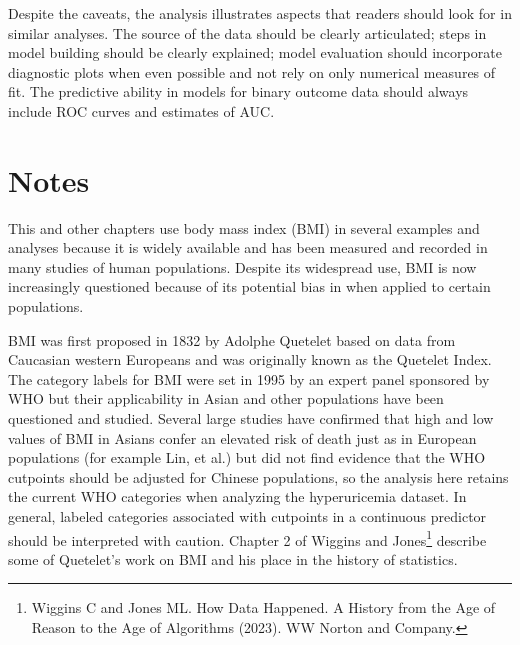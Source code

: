 Despite the caveats, the analysis illustrates aspects that readers should look for in similar analyses. The source of the data should be clearly articulated; steps in model building should be clearly explained; model evaluation should incorporate diagnostic plots when even possible and not rely on only numerical  measures of fit.  The predictive ability in models for binary outcome data should always include ROC curves and estimates of AUC.

\textD{\newpage}

\section{Notes}
\label{notesLogisticRegression}

This and other chapters use body mass index (BMI) in several examples and analyses because it is widely available and has been measured and recorded in many studies of human populations. Despite its widespread use, BMI is now increasingly questioned because of its potential bias in when applied to certain populations.

BMI was first proposed in 1832 by Adolphe Quetelet based on data from Caucasian western Europeans and was originally known as the Quetelet Index. The category labels for BMI were set in 1995 by an expert panel sponsored by WHO but their applicability in Asian and other populations have been questioned and studied.  Several large studies have confirmed that high and low values of BMI in Asians confer an elevated risk of death just as in European populations (for example Lin, et al.) but did not find evidence that the WHO cutpoints should be adjusted for Chinese populations, so the analysis here retains the current WHO categories when analyzing the hyperuricemia dataset.  In general, labeled categories associated with cutpoints in a continuous predictor should be interpreted with caution.  Chapter 2 of Wiggins and Jones\footnote{Wiggins C and Jones ML.  How Data Happened.  A History from the Age of Reason to the Age of Algorithms (2023).  WW Norton and Company.} describe some of Quetelet's work on BMI and his place in the history of statistics.



